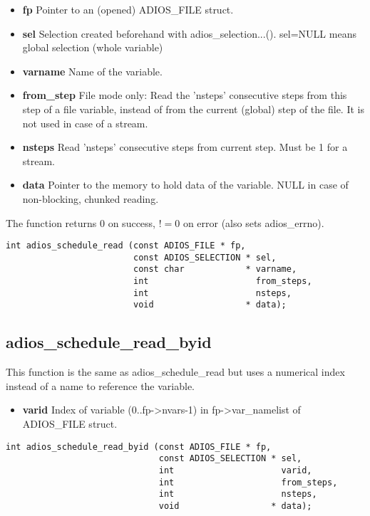 \begin{itemize}
\item{\bf  fp}         Pointer to an (opened) ADIOS\_FILE struct.
\item{\bf  sel}        Selection created beforehand with adios\_selection...().
                 sel=NULL means global selection (whole variable)
\item{\bf  varname}    Name of the variable.
\item{\bf  from\_step}  File mode only: Read the 'nsteps' consecutive steps from this 
step of a file variable, instead of from the current (global) step of the file. It is not used in case of a stream.
\item{\bf nsteps}     Read 'nsteps' consecutive steps from current step. Must be 1 for a stream. 
\item{\bf data} Pointer to the memory to hold data of the variable. NULL in case of non-blocking, chunked reading.
\end{itemize}

The function returns 0 on success, $!=0$ on error (also sets adios\_errno).

\begin{lstlisting}[alsolanguage=C]
int adios_schedule_read (const ADIOS_FILE * fp,
                         const ADIOS_SELECTION * sel,
                         const char            * varname,
                         int                     from_steps,
                         int                     nsteps,
                         void                  * data);
\end{lstlisting}



\subsection{adios\_schedule\_read\_byid}
This function is the same as adios\_schedule\_read but uses a numerical index instead of a name to reference the variable. 

\begin{itemize}
\item{\bf varid} Index of variable (0..fp->nvars-1) in fp->var\_namelist of ADIOS\_FILE struct. 
\end{itemize}

\begin{lstlisting}[alsolanguage=C]
int adios_schedule_read_byid (const ADIOS_FILE * fp, 
                              const ADIOS_SELECTION * sel,
                              int                     varid,
                              int                     from_steps,
                              int                     nsteps,
                              void                  * data);
\end{lstlisting}



